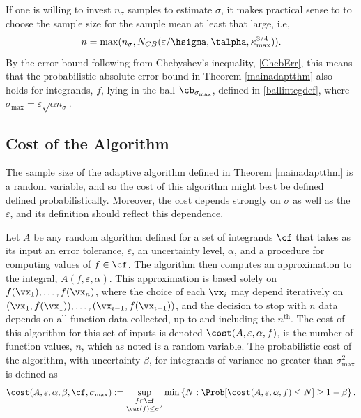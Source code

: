 \documentclass[graybox]{svmult}
\begin{document}
\begin{remark} If one is willing to invest $n_\sigma$ samples to estimate $\sigma$, it makes practical sense to to choose the sample size for the sample mean at least that large, i.e, 
\[
n = \max(n_{\sigma},N_{CB}(\varepsilon/\hsigma,\talpha,\kappa_{\max}^{3/4})).
\]
By the error bound following from Chebyshev's inequality, \eqref{ChebErr}, this means that the probabilistic absolute error bound in Theorem \ref{mainadaptthm} also holds for integrands, $f$, lying in the ball $\cb_{\sigma_{\max}}$, defined in \eqref{ballintegdef}, where $\sigma_{\max} = \varepsilon \sqrt{\alpha n_{\sigma}}$.
\end{remark}


\subsection{Cost of the Algorithm}  The sample size of the adaptive algorithm defined in Theorem \ref{mainadaptthm} is a random variable, and so the cost of this algorithm might best be defined defined probabilistically.  Moreover, the cost depends strongly on $\sigma$ as well as the $\varepsilon$, and its definition should reflect this dependence. 

Let $A$ be any random algorithm defined for a set of integrands $\cf$ that takes as its input an error tolerance, $\varepsilon$, an uncertainty level, $\alpha$, and a  procedure for computing values of $f \in \cf$.  The algorithm then computes an approximation to the integral, $A(f,\varepsilon,\alpha)$.  This approximation is based solely on  $f(\vx_1), \ldots, f(\vx_n)$, where the choice of each $\vx_i$ may depend iteratively on $(\vx_1,f(\vx_1)), \ldots, (\vx_{i-1},f(\vx_{i-1}))$, and the decision to stop with $n$ data depends on all function data collected, up to and including the $n^{\text{th}}$.  The cost of this algorithm for this set of inputs is denoted $\cost(A,\varepsilon,\alpha,f)$, is the number of function values, $n$, which as noted is a random variable.  The probabilistic cost of the algorithm, with uncertainty $\beta$, for integrands of variance no greater than $\sigma^2_{\max}$ is defined as 
\begin{equation}
\cost(A,\varepsilon,\alpha,\beta,\cf,\sigma_{\max}) := \sup_{\substack{f \in \cf\\ \var(f)\le \sigma^2} } \min\left\{N : \Prob[\cost(A,\varepsilon,\alpha,f) \le N] \ge 1-\beta  \right \}.
\end{equation}
\end{document}
